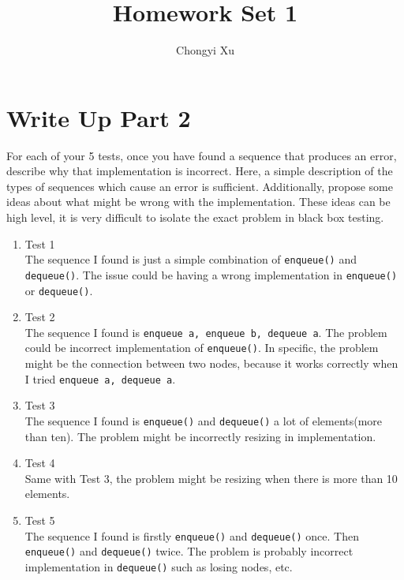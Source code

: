 \documentclass[]{exam}
\title{}
\title{Homework Set 1}
\author{Chongyi Xu}
\begin{document}
	
\maketitle

\section*{Write Up Part 2}
For each of your 5 tests, once you have found a sequence that produces an error, describe why that implementation is incorrect. Here, a simple description of the types of sequences which cause an error is sufficient. Additionally, propose some ideas about what might be wrong with the implementation. These ideas can be high level, it is very difficult to isolate the exact problem in black box testing.
	\\
\begin{enumerate}
	\item Test 1
	\\ The sequence I found is just a simple combination of \verb|enqueue()| and \verb|dequeue()|. The issue could be having a wrong implementation in \verb|enqueue()| or \verb|dequeue()|.
	\item Test 2
	\\ The sequence I found is \verb|enqueue a, enqueue b, dequeue a|. The problem could be incorrect implementation of \verb|enqueue()|. In specific, the problem might be the connection between two nodes, because it works correctly when I tried \verb|enqueue a, dequeue a|.
	\item Test 
3	\\ The sequence I found is \verb|enqueue()| and \verb|dequeue()| a lot of elements(more than ten). The problem might be incorrectly resizing in implementation.
	\item Test 4
	\\ Same with Test 3, the problem might be resizing when there is more than 10 elements.
	\item Test 5
	\\ The sequence I found is firstly \verb|enqueue()|  and \verb|dequeue()| once. Then \verb|enqueue()| and \verb|dequeue()| twice. The problem is probably incorrect implementation in \verb|dequeue()| such as losing nodes, etc.
\end{enumerate}
\end{document}
